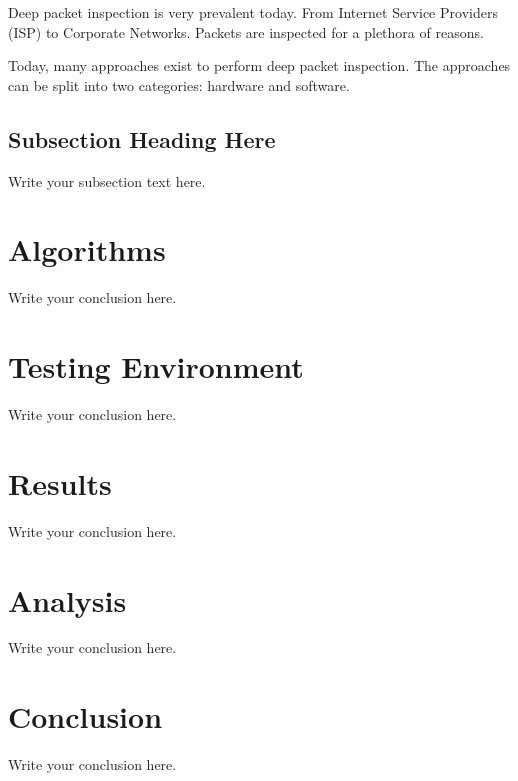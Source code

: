 \documentclass{article}
\begin{document}
Deep packet inspection is very prevalent today. From Internet Service Providers (ISP) to Corporate Networks. Packets are inspected for a plethora of reasons. 

Today, many approaches exist to perform deep packet inspection. The approaches can be split into two categories: hardware and software. 

\subsection{Subsection Heading Here}
Write your subsection text here.

\section{Algorithms}
Write your conclusion here.

\section{Testing Environment}
Write your conclusion here.

\section{Results}
Write your conclusion here.

\section{Analysis}
Write your conclusion here.

\section{Conclusion}
Write your conclusion here.

\nocite{*}



\end{document}
